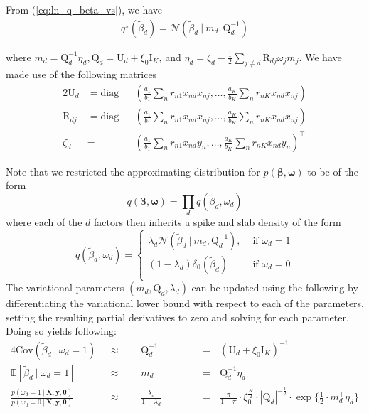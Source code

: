 \documentclass[twoside,11pt]{article}
\newcommand\given[1][]{\:#1\vert\:}
\newcommand{\transpose}[1]{#1^{\intercal}}
\newcommand{\nsum}{\sum\limits_{n}}
\newcommand{\boldbeta}{\boldsymbol\beta}
\newcommand{\E}{\mathbb{E}}
\newcommand{\betad}{\tilde{\beta}_d}
\newcommand{\umat}{\mathrm{U}}
\newcommand{\qmat}{\mathrm{Q}}
\newcommand{\pr}[1]{p \left( #1 \right)}
\begin{document}
From (\ref{eq:ln_q_beta_vs}), we have
\begin{align*}
	q^{\star}(\betad) = \mathcal{N} \left( \betad \given m_d, \qmat_d^{-1} \right)
\end{align*}

where $m_d = \qmat_d^{-1} \eta_d, \qmat_d = \umat_d + \xi_0 \mathrm{I}_K$, and $\eta_d = \zeta_d - \frac{1}{2} \sum\limits_{j \neq d} \mathrm{R}_{dj} \omega_j m_j$. We have made use of the following matrices
\begin{alignat}{2}
	\umat_d &= \mathrm{diag} &&\left(\frac{a_1}{b_1} \nsum r_{n1} x_{nd}x_{nj}, \ldots, \frac{a_K}{b_K} \nsum r_{nK} x_{nd}x_{nj} \right) \\
	\mathrm{R}_{dj} &= \mathrm{diag} &&\left(\frac{a_1}{b_1} \nsum r_{n1} x_{nd}x_{nj}, \ldots, \frac{a_K}{b_K} \nsum r_{nK} x_{nd}x_{nj} \right) \\
	\zeta_d &= &&\transpose{\left( \frac{a_1}{b_1} \nsum r_{n1} x_{nd}y_{n}, \ldots, \frac{a_K}{b_K} \nsum r_{nK} x_{nd}y_{n} \right)}
\end{alignat}



Note that we restricted the approximating distribution for $\pr{\boldbeta, \boldsymbol\omega}$ to be of the form
$$ q \left( \boldbeta, \boldsymbol \omega\right) = \prod_{d} q \left( \betad, \omega_d \right) $$
where each of the $d$ factors then inherits a spike and slab density of the form
\[   
q \left( \betad, \omega_d \right) = 
\left\{
\begin{array}{ll}
      \lambda_d \mathcal{N} \left( \betad \given m_d, \qmat_d^{-1} \right),  & \textrm{ if } \omega_d = 1 \\
      (1 - \lambda_d) \delta_0 \left( \betad \right) & \textrm{ if } \omega_d = 0 \\
\end{array} 
\right. \]
The variational parameters $(m_d, \qmat_d, \lambda_d)$ can be updated using the following by differentiating the variational lower bound with respect to each of the parameters, setting the resulting partial derivatives to zero and solving for each parameter. Doing so yields following:
\setlength{\jot}{10pt}
\begin{alignat}{4}
  \mathrm{Cov}(\betad \given \omega_d = 1) \textrm{ } &\approx \textrm{ }&& \qmat_d^{-1} &&\textrm{ } & &= \textrm{ } \left(\umat_d + \xi_0 \mathrm{I}_K\right)^{-1} \label{eq:var_betad}\\
  \E [ \betad \given \omega_d = 1]  \textrm{ }&\approx \textrm{ } && m_d &&\textrm{ }& &= \textrm{ } \qmat_d^{-1} \eta_d  \label{eq:e_betad}\\
  \frac{\pr{\omega_d = 1\given \mathbf{X}, \mathbf{y}, \boldsymbol\theta}}{\pr{\omega_d = 0 \given \mathbf{X}, \mathbf{y}, \boldsymbol\theta}} \textrm{ } &\approx \textrm{ } && \frac{\lambda_d}{1-\lambda_d}&& \textrm{ }& &= \textrm{ } \frac{\pi}{1-\pi} \cdot \xi_0^{\frac{K}{2}} \cdot |\qmat_d|^{-\frac{1}{2}}\cdot \exp\Big\{\frac{1}{2} \cdot \transpose{m_d}\eta_d\Big\} \label{eq:logodds_lambda}
\end{alignat}
\end{document}
